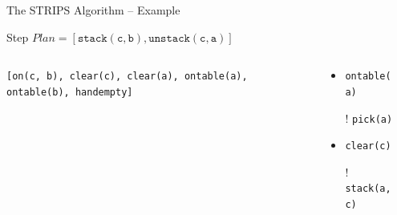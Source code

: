 \documentclass[presentation]{beamer}\mode<presentation>{\usetheme{AMSBolognaFC}}
\begin{document}
\begin{frame}[c]{The STRIPS Algorithm -- Example}
\small

\begin{exampleblock}{Step \nextStripsExampleStep{} \hfill $Plan = [\mathtt{stack(c,b),unstack(c,a)}]$}
    \begin{columns}[t]
        \begin{column}{.30\linewidth}\centering
            \texttt{[on(c, b), clear(c), clear(a), \alert{ontable(a)}, ontable(b), handempty]}
        \end{column}
        \begin{column}{.50\linewidth}\centering
            \begin{itemize}
                \item \alert{\texttt{ontable(a)}}
                \item[!] \texttt{pick(a)}
                \item \texttt{clear(c)}
                \item[!] \texttt{stack(a,c)}
            \end{itemize}
        \end{column}
        \begin{column}{.10\linewidth}\centering
            
        \end{column}
    \end{columns}
\end{exampleblock}

\end{frame}
\end{document}
